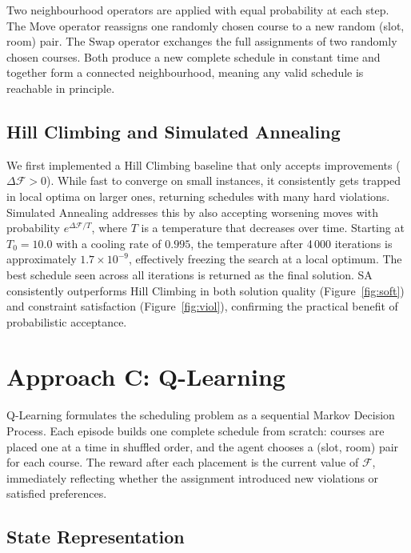 \documentclass[letterpaper]{article}
\begin{document}
Two neighbourhood operators are applied with equal probability at each step. The Move operator reassigns one randomly chosen course to a new random (slot, room) pair. The Swap operator exchanges the full assignments of two randomly chosen courses. Both produce a new complete schedule in constant time and together form a connected neighbourhood, meaning any valid schedule is reachable in principle.

\subsection{Hill Climbing and Simulated Annealing}

We first implemented a Hill Climbing baseline that only accepts improvements ($\Delta\mathcal{F} > 0$). While fast to converge on small instances, it consistently gets trapped in local optima on larger ones, returning schedules with many hard violations. Simulated Annealing addresses this by also accepting worsening moves with probability $e^{\Delta\mathcal{F}/T}$, where $T$ is a temperature that decreases over time. Starting at $T_0 = 10.0$ with a cooling rate of $0.995$, the temperature after 4\,000 iterations is approximately $1.7 \times 10^{-9}$, effectively freezing the search at a local optimum. The best schedule seen across all iterations is returned as the final solution. SA consistently outperforms Hill Climbing in both solution quality (Figure~\ref{fig:soft}) and constraint satisfaction (Figure~\ref{fig:viol}), confirming the practical benefit of probabilistic acceptance.

\section{Approach C: Q-Learning}

Q-Learning formulates the scheduling problem as a sequential Markov Decision Process. Each episode builds one complete schedule from scratch: courses are placed one at a time in shuffled order, and the agent chooses a (slot, room) pair for each course. The reward after each placement is the current value of $\mathcal{F}$, immediately reflecting whether the assignment introduced new violations or satisfied preferences.

\subsection{State Representation}
\end{document}
